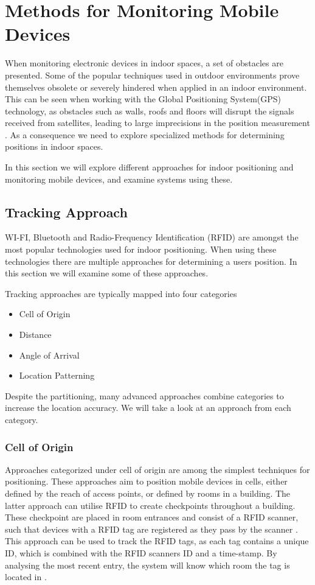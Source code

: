 \section{Methods for Monitoring Mobile Devices}\label{sec:monitoring} 

When monitoring electronic devices in indoor spaces, a set of obstacles are presented. Some of the popular techniques used in outdoor environments prove themselves obsolete or severely hindered when applied in an indoor environment. This can be seen when working with the Global Positioning System(GPS) technology, as obstacles such as walls, roofs and floors will disrupt the signals received from satellites, leading to large imprecisions in the position measurement \cite{gps_indoor}. As a consequence we need to explore specialized methods for determining positions in indoor spaces.

In this section we will explore different approaches for indoor positioning and monitoring mobile devices, and examine systems using these.

\subsection{Tracking Approach}\label{sec:tracking_approach}
WI-FI, Bluetooth and Radio-Frequency Identification (RFID) are amongst the most popular technologies used for indoor positioning. When using these technologies there are multiple approaches for determining a users position. In this section we will examine some of these approaches.

Tracking approaches are typically mapped into four categories \cite{tracking_approaches}
\begin{itemize}
\item Cell of Origin
\item Distance
\item Angle of Arrival
\item Location Patterning
\end{itemize}
Despite the partitioning, many advanced approaches combine categories to increase the location accuracy. We will take a look at an approach from each category.

\subsubsection*{Cell of Origin}
Approaches categorized under cell of origin are among the simplest techniques for positioning. These approaches aim to position mobile devices in cells, either defined by the reach of access points, or defined by rooms in a building.
The latter approach can utilise RFID to create checkpoints throughout a building. These checkpoint are placed in room entrances and consist of a RFID scanner, such that devices with a RFID tag are registered as they pass by the scanner \cite{indoor_bin}. 
This approach can be used to track the RFID tags, as each tag contains a unique ID, which is combined with the RFID scanners ID and a time-stamp. By analysing the most recent entry, the system will know which room the tag is located in \cite{RFIDjournal}.

